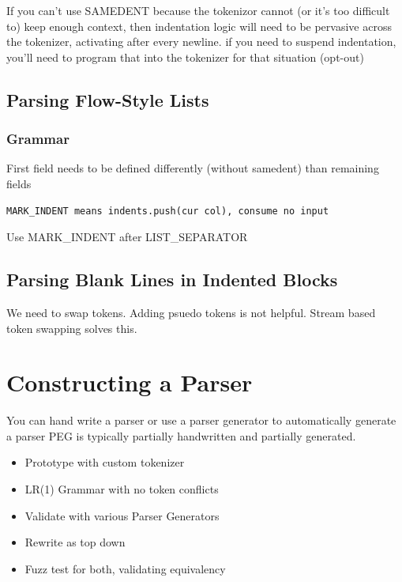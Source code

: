 \documentclass{book}
\begin{document}
If you can't use SAMEDENT because the tokenizor cannot (or it's too difficult to)
keep enough context, then indentation logic will need to be pervasive across the
tokenizer, activating after every newline. if you need to suspend indentation, 
you'll need to program that into the tokenizer for that situation (opt-out)

\section{Parsing Flow-Style Lists}

\subsection{Grammar}
First field needs to be defined differently (without samedent) than remaining fields
\begin{verbatim}
MARK_INDENT means indents.push(cur col), consume no input
\end{verbatim}
Use MARK\_INDENT after LIST\_SEPARATOR

\section{Parsing Blank Lines in Indented Blocks}
We need to swap tokens. Adding psuedo tokens is not helpful.
Stream based token swapping solves this.



%
%
\chapter{Constructing a Parser}
You can hand write a parser or use a parser generator to automatically
generate a parser
PEG is typically partially handwritten and partially generated.

\begin{itemize}
    \item Prototype with custom tokenizer
    \item LR(1) Grammar with no token conflicts
    \item Validate with various Parser Generators
    \item Rewrite as top down
    \item Fuzz test for both, validating equivalency
\end{itemize}
\end{document}
